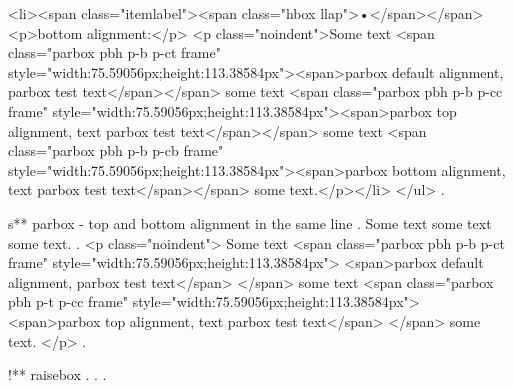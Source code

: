 <li><span class="itemlabel"><span class="hbox llap">•</span></span>
<p>bottom alignment:</p>
<p class="noindent">Some text <span class="parbox pbh p-b p-ct frame" style="width:75.59056px;height:113.38584px"><span>parbox default alignment, parbox test text</span></span> some text <span class="parbox pbh p-b p-cc frame" style="width:75.59056px;height:113.38584px"><span>parbox top alignment, text parbox test text</span></span> some text <span class="parbox pbh p-b p-cb frame" style="width:75.59056px;height:113.38584px"><span>parbox bottom alignment, text parbox test text</span></span> some text.</p></li>
</ul>
.


s** parbox - top and bottom alignment in the same line
.
\noindent
Some text
some text
some text.
.
<p class="noindent">
Some text <span class="parbox pbh p-b p-ct frame" style="width:75.59056px;height:113.38584px">
<span>parbox default alignment, parbox test text</span>
</span> some text <span class="parbox pbh p-t p-cc frame" style="width:75.59056px;height:113.38584px">
<span>parbox top alignment, text parbox test text</span>
</span> some text.
</p>
.


!** raisebox
.
.
.